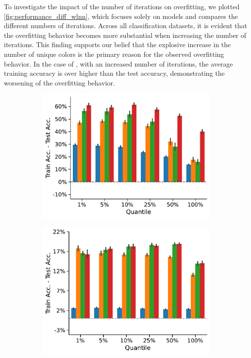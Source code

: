 To investigate the impact of the number of \wl iterations on overfitting, we plotted \cref{fig:performance_diff_wlnn}, which focuses solely on \wlnn models and compares the different numbers of \wl iterations. Across all classification datasets, it is evident that the overfitting behavior becomes more substantial when increasing the number of \wl iterations. This finding supports our belief that the explosive increase in the number of unique colors is the primary reason for the observed overfitting behavior. In the case of \enzymes, with an increased number of \wl iterations, the average training accuracy is over  higher than the test accuracy, demonstrating the worsening of the overfitting behavior.

\begin{figure}[htb]
	\centering
	\begin{subfigure}[b]{0.3\textwidth}
		\centering
		\includegraphics[width=\textwidth]{Figures/train_test_diff_k_wl_ENZYMES.pdf}
		\vspace*{-4ex} 
		\caption{\enzymes}
	\end{subfigure}
	\hfill
	\begin{subfigure}[b]{0.3\textwidth}
		\centering
		\includegraphics[width=\textwidth]{Figures/train_test_diff_k_wl_IMDB-BINARY.pdf}

\end{subfigure}
\end{figure}
